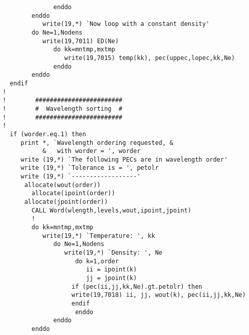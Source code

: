 \begin{appendices}
\begin{verbatim}
              enddo
        enddo
           write(19,*) `Now loop with a constant density'
        do Ne=1,Nodens
           write(19,7011) ED(Ne)
              do kk=mntmp,mxtmp
                 write(19,7015) temp(kk), pec(uppec,lopec,kk,Ne)
              enddo
        enddo
  endif
!
!        ########################
!        #  Wavelength sorting  #
!        ########################
!
  if (worder.eq.1) then
     print *, `Wavelength ordering requested, &
           &   with worder = ', worder
     write (19,*) `The following PECs are in wavelength order'
     write (19,*) `Tolerance is = ', petolr
     write (19,*) `------------------'
      allocate(wout(order))
        allocate(ipoint(order))
      allocate(jpoint(order))
        CALL Word(wlength,levels,wout,ipoint,jpoint)
        !
        do kk=mntmp,mxtmp
           write(19,*) `Temperature: ', kk
              do Ne=1,Nodens
                 write(19,*) `Density: ', Ne
                    do k=1,order
                       ii = ipoint(k)
                       jj = jpoint(k)
                   if (pec(ii,jj,kk,Ne).gt.petolr) then
                   write(19,7018) ii, jj, wout(k), pec(ii,jj,kk,Ne)
                   endif
                    enddo
              enddo
        enddo


\end{verbatim}
\end{appendices}
